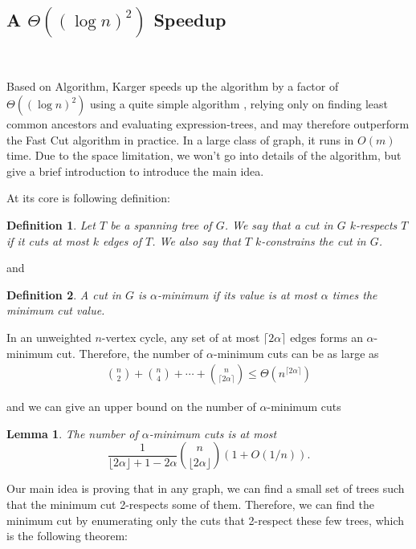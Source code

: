 \documentclass[11pt]{article}
\theoremstyle{plain}
\newtheorem{lemma}{Lemma}[section]
\newtheorem{definition}{Definition}[section]
\begin{document}
\subsection{A \texorpdfstring{$\Theta((\log n)^2)$}{ } Speedup}\

Based on Algorithm, Karger speeds up the algorithm by a factor of $\Theta((\log n)^2)$ using a quite simple algorithm \cite{karger2000minimum}, relying only on finding least common ancestors and evaluating expression-trees, and may
therefore outperform the Fast Cut algorithm in practice. In a large class of graph, it runs in $O(m)$ time. Due to the space limitation, we won't go into details of the algorithm, but give a brief introduction to introduce the main idea.

At its core is following definition:

\begin{definition}
    Let $T$ be a spanning tree of $G$. We say that a cut in $G$ $k$-respects $T$ if it cuts at most $k$ edges of $T$. We also say that $T$ $k$-constrains the cut in $G$.
\end{definition}

and 

\begin{definition}
    A cut in $G$ is $\alpha$-minimum if its value is at most
    $\alpha$ times the minimum cut value.
\end{definition}

In an unweighted $n$-vertex cycle, any set of at most $\lceil 2\alpha\rceil$ edges forms an $\alpha$-minimum cut. Therefore, the number of $\alpha$-minimum cuts can be as large as
\begin{align*}
    \binom{n}{2}+\binom{n}{4}+\cdots+\binom{n}{\lceil 2\alpha\rceil}\leq \Theta(n^{\lceil 2\alpha\rceil})
\end{align*}

and we can give an upper bound on the number of $\alpha$-minimum cuts

\begin{lemma}
    The number of $\alpha$-minimum cuts is at most
  \[
  \frac{1}{\lfloor 2\alpha \rfloor + 1 -2\alpha} \binom{n}{\lfloor
      2\alpha \rfloor}(1+O(1/n)).
  \]
\end{lemma} 

Our main idea is proving that in any graph, we can find a small set of trees such that the minimum cut 2-respects some of them. Therefore, we can find the minimum cut by enumerating only the cuts that 2-respect these few trees, which is the following theorem:
\end{document}
